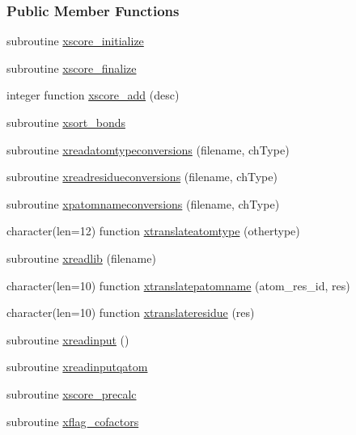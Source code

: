 \subsubsection*{Public Member Functions}
\begin{DoxyCompactItemize}
\item 
subroutine \hyperlink{classcalc__xscore_a0bf9c5725696dfd8e6afd92c7eae7b86}{xscore\-\_\-initialize}
\item 
subroutine \hyperlink{classcalc__xscore_a520f096fd642c5abc03bcb0cd9ee421b}{xscore\-\_\-finalize}
\item 
integer function \hyperlink{classcalc__xscore_a54166bda8a73b7847edce41e4b3268d5}{xscore\-\_\-add} (desc)
\item 
subroutine \hyperlink{classcalc__xscore_aba6405f41f1d5e07fc644f6a83688cd6}{xsort\-\_\-bonds}
\item 
subroutine \hyperlink{classcalc__xscore_acc95a504ed30541bd4b1af420cdbe89e}{xreadatomtypeconversions} (filename, ch\-Type)
\item 
subroutine \hyperlink{classcalc__xscore_a639279bce21a4a68fbecab09a523428b}{xreadresidueconversions} (filename, ch\-Type)
\item 
subroutine \hyperlink{classcalc__xscore_a8e1bd4c81da5b457b1ba09dfd030247a}{xpatomnameconversions} (filename, ch\-Type)
\item 
character(len=12) function \hyperlink{classcalc__xscore_a9559d0d887b2f9aea9fd193a813e6a88}{xtranslateatomtype} (othertype)
\item 
subroutine \hyperlink{classcalc__xscore_ac45f5ae56d0a4147e233f5fb74e22a5d}{xreadlib} (filename)
\item 
character(len=10) function \hyperlink{classcalc__xscore_a55f17e0da93c003d8db2ad97b9ece75e}{xtranslatepatomname} (atom\-\_\-res\-\_\-id, res)
\item 
character(len=10) function \hyperlink{classcalc__xscore_a63bbb7ac15e0a0d94c96d89c57dba816}{xtranslateresidue} (res)
\item 
subroutine \hyperlink{classcalc__xscore_ad9e224a154cfb48f8601f6a08a2d7321}{xreadinput} ()
\item 
subroutine \hyperlink{classcalc__xscore_ae20ad6ecf425b36c82d916e7f3bb1f49}{xreadinputqatom}
\item 
subroutine \hyperlink{classcalc__xscore_a1dd20b02356cb3c99283799d1030d1ba}{xscore\-\_\-precalc}
\item 
subroutine \hyperlink{classcalc__xscore_a1e1a4cc3c9721268f33da2b7300c7299}{xflag\-\_\-cofactors}
\item 

\end{DoxyCompactItemize}
